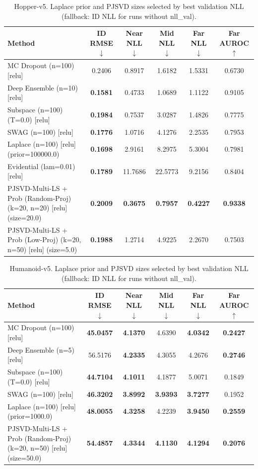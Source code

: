 \begin{table}[t]
\centering
\caption{Hopper-v5. Laplace prior and PJSVD sizes selected by best validation NLL (fallback: ID NLL for runs without nll_val).}
\begin{tabular}{lccccc}
\toprule
Method & ID RMSE $\downarrow$ & Near NLL $\downarrow$ & Mid NLL $\downarrow$ & Far NLL $\downarrow$ & Far AUROC $\uparrow$ \\
\midrule
MC Dropout (n=100) [relu] & 0.2406 & 0.8917 & 1.6182 & 1.5331 & 0.6730 \\
Deep Ensemble (n=10) [relu] & \textbf{0.1581} & 0.4733 & 1.0689 & 1.1122 & 0.9105 \\
Subspace (n=100) (T=0.0) [relu] & \textbf{0.1984} & 0.7537 & 3.0287 & 1.4826 & 0.7775 \\
SWAG (n=100) [relu] & \textbf{0.1776} & 1.0716 & 4.1276 & 2.2535 & 0.7953 \\
Laplace (n=100) [relu] (prior=100000.0) & \textbf{0.1698} & 2.9161 & 8.2975 & 5.3004 & 0.7981 \\
Evidential (lam=0.01) [relu] & \textbf{0.1789} & 11.7686 & 22.5773 & 9.2156 & 0.8404 \\
PJSVD-Multi-LS + Prob (Random-Proj) (k=20, n=20) [relu] (size=20.0) & \textbf{0.2009} & \textbf{0.3675} & \textbf{0.7957} & \textbf{0.4227} & \textbf{0.9338} \\
PJSVD-Multi-LS + Prob (Low-Proj) (k=20, n=50) [relu] (size=5.0) & \textbf{0.1988} & 1.2714 & 4.9225 & 2.2670 & 0.7503 \\
\bottomrule
\end{tabular}
\end{table}

\begin{table}[t]
\centering
\caption{Humanoid-v5. Laplace prior and PJSVD sizes selected by best validation NLL (fallback: ID NLL for runs without nll_val).}
\begin{tabular}{lccccc}
\toprule
Method & ID RMSE $\downarrow$ & Near NLL $\downarrow$ & Mid NLL $\downarrow$ & Far NLL $\downarrow$ & Far AUROC $\uparrow$ \\
\midrule
MC Dropout (n=100) [relu] & \textbf{45.0457} & \textbf{4.1370} & 4.6390 & \textbf{4.0342} & \textbf{0.2427} \\
Deep Ensemble (n=5) [relu] & 56.5176 & \textbf{4.2335} & 4.3055 & 4.2676 & \textbf{0.2746} \\
Subspace (n=100) (T=0.0) [relu] & \textbf{44.7104} & \textbf{4.1011} & 4.1877 & 5.0071 & 0.1849 \\
SWAG (n=100) [relu] & \textbf{46.3202} & \textbf{3.8992} & \textbf{3.9393} & \textbf{3.7277} & 0.1952 \\
Laplace (n=100) [relu] (prior=1000.0) & \textbf{48.0055} & \textbf{4.3258} & 4.2239 & \textbf{3.9450} & \textbf{0.2559} \\
PJSVD-Multi-LS + Prob (Random-Proj) (k=20, n=50) [relu] (size=50.0) & \textbf{54.4857} & \textbf{4.3344} & \textbf{4.1130} & \textbf{4.1294} & \textbf{0.2076} \\
\bottomrule
\end{tabular}
\end{table}
